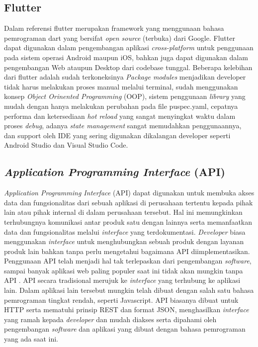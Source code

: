 \begin{flushleft}
\begin{justify}
        \subsection{Flutter}
        Dalam referensi \cite{flutter} flutter merupakan framework yang menggunaan bahasa pemrograman dart yang 
        bersifat \emph{open source} (terbuka) dari Google. Flutter dapat digunakan dalam pengembangan aplikasi \emph{cross-platform} untuk penggunaan pada sistem operasi Android maupun iOS, 
        bahkan juga dapat digunakan dalam pengembangan Web ataupun Desktop dari codebase tunggal. 
        Beberapa kelebihan dari flutter adalah sudah terkoneksinya \textit{Package modules} menjadikan developer tidak harus melakukan proses manual melalui terminal, 
        sudah menggunakan konsep \textit{Object Orinented Programming} (OOP), sistem penggunaan \emph{library} yang mudah dengan hanya melakukan perubahan pada file puspec.yaml, cepatnya performa dan ketersediaan \emph{hot reload} yang sangat menyingkat waktu 
        dalam proses \emph{debug}, adanya \emph{state management} sangat memudahkan penggunaannya, dan support oleh IDE yang sering digunakan dikalangan developer seperti Android Studio dan Visual Studio Code.\\


        \subsection{\textit{Application Programming Interface} (API)}
            \textit{Application Programming Interface} (API) dapat digunakan untuk membuka akses data dan fungsionalitas dari sebuah aplikasi di perusahaan tertentu kepada pihak lain atau pihak internal di dalam perusahaan tersebut. 
            Hal ini memungkinkan terhubungnya komunikasi antar produk satu dengan lainnya serta memanfaatkan data dan fungsionalitas melalui \textit{interface} yang terdokumentasi. 
            \textit{Developer} biasa menggunakan \textit{interface} untuk menghubungkan sebuah produk dengan layanan produk lain bahkan tanpa perlu mengetahui bagaimana API diimplementasikan. 
            Penggunaan API telah menjadi hal tak terlepaskan dari pengembangan \emph{software}, sampai banyak aplikasi web paling populer saat ini tidak akan mungkin tanpa API \cite{API}. 
            API secara tradisional merujuk ke \textit{interface} yang terhubung ke aplikasi lain. Dalam aplikasi lain tersebut mungkin telah dibuat dengan salah satu bahasa pemrograman tingkat rendah, seperti Javascript. 
            API biasanya dibuat untuk HTTP serta mematuhi prinsip REST dan format JSON, menghasilkan \textit{interface} yang ramah kepada \textit{developer} dan mudah diakses serta dipahami oleh pengembangan \emph{software} 
            dan aplikasi yang dibuat dengan bahasa pemrograman yang ada saat ini.
            \\



\end{justify}
\end{flushleft}
